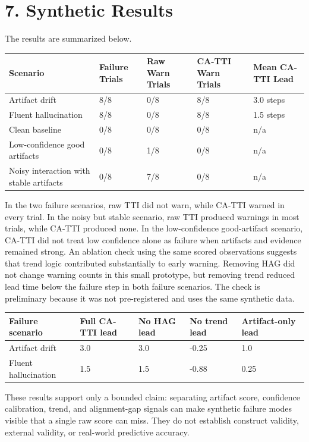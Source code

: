\documentclass[11pt]{article}
\begin{document}
\section{7. Synthetic Results}
The results are summarized below.
\begin{center}\small
\begin{tabularx}{\linewidth}{Y|Y|Y|Y|Y}
\toprule
Scenario & Failure Trials & Raw Warn Trials & CA-TTI Warn Trials & Mean CA-TTI Lead \\
\midrule
Artifact drift & 8/8 & 0/8 & 8/8 & 3.0 steps \\
Fluent hallucination & 8/8 & 0/8 & 8/8 & 1.5 steps \\
Clean baseline & 0/8 & 0/8 & 0/8 & n/a \\
Low-confidence good artifacts & 0/8 & 1/8 & 0/8 & n/a \\
Noisy interaction with stable artifacts & 0/8 & 7/8 & 0/8 & n/a \\
\bottomrule
\end{tabularx}
\end{center}
In the two failure scenarios, raw TTI did not warn, while CA-TTI warned in every trial. In the noisy but stable scenario, raw TTI produced warnings in most trials, while CA-TTI produced none. In the low-confidence good-artifact scenario, CA-TTI did not treat low confidence alone as failure when artifacts and evidence remained strong.
An ablation check using the same scored observations suggests that trend logic contributed substantially to early warning. Removing HAG did not change warning counts in this small prototype, but removing trend reduced lead time below the failure step in both failure scenarios. The check is preliminary because it was not pre-registered and uses the same synthetic data.
\begin{center}\small
\begin{tabularx}{\linewidth}{Y|Y|Y|Y|Y}
\toprule
Failure scenario & Full CA-TTI lead & No HAG lead & No trend lead & Artifact-only lead \\
\midrule
Artifact drift & 3.0 & 3.0 & -0.25 & 1.0 \\
Fluent hallucination & 1.5 & 1.5 & -0.88 & 0.25 \\
\bottomrule
\end{tabularx}
\end{center}
These results support only a bounded claim: separating artifact score, confidence calibration, trend, and alignment-gap signals can make synthetic failure modes visible that a single raw score can miss. They do not establish construct validity, external validity, or real-world predictive accuracy.
\end{document}

